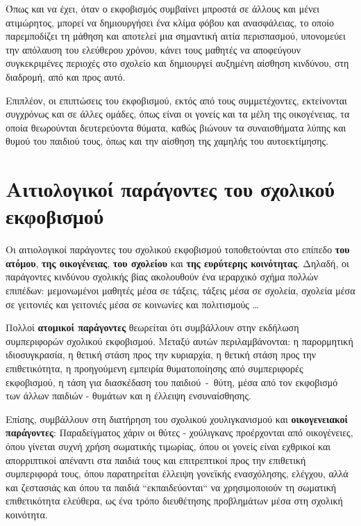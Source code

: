 \documentclass[12pt,a4paper,oneside]{book}
\begin{document}
\indent Όπως και να έχει, όταν ο εκφοβισμός συμβαίνει μπροστά σε άλλους και
μένει ατιμώρητος, μπορεί να δημιουργήσει ένα κλίμα φόβου και ανασφάλειας, το οποίο παρεμποδίζει τη μάθηση και αποτελεί μια
σημαντική αιτία περισπασμού, υπονομεύει την απόλαυση του ελεύθερου χρόνου, κάνει
τους μαθητές να αποφεύγουν συγκεκριμένες περιοχές στο σχολείο και δημιουργεί
αυξημένη αίσθηση κινδύνου, στη διαδρομή, από και προς αυτό.

\indent Επιπλέον, οι επιπτώσεις του εκφοβισμού, εκτός από τους συμμετέχοντες,
εκτείνονται συγχρόνως και σε άλλες ομάδες, όπως είναι οι γονείς και τα μέλη της οικογένειας, τα οποία θεωρούνται
δευτερεύοντα θύματα, καθώς βιώνουν τα συναισθήματα λύπης και θυμού του παιδιού
τους, όπως και την αίσθηση της χαμηλής του αυτοεκτίμησης.
\section*{Αιτιολογικοί παράγοντες του σχολικού εκφοβισμού}
\indent Οι αιτιολογικοί παράγοντες του σχολικού εκφοβισμού τοποθετούνται στο
επίπεδο \textbf{του ατόμου}, \textbf{της οικογένειας}, \textbf{του σχολείου} και \textbf{της ευρύτερης κοινότητας}.
Δηλαδή, οι παράγοντες κινδύνου σχολικής βίας ακολουθούν ένα ιεραρχικό σχήμα πολλών επιπέδων: μεμονωμένοι μαθητές μέσα σε
τάξεις, τάξεις μέσα σε σχολεία, σχολεία μέσα σε γειτονιές και  γειτονιές μέσα
σε κοινωνίες και πολιτισμούς \ldots

\indent Πολλοί \textbf{ατομικοί παράγοντες} θεωρείται ότι συμβάλλουν στην
εκδήλωση συμπεριφορών σχολικού εκφοβισμού. Μεταξύ αυτών περιλαμβάνονται: η παρορμητική ιδιοσυγκρασία, η θετική στάση προς την
κυριαρχία, η θετική στάση προς την επιθετικότητα, η προηγούμενη εμπειρία
θυματοποίησης από συμπεριφορές εκφοβισμού, η τάση για διασκέδαση του
\mbox{παιδιού - θύτη}, μέσα από τον εκφοβισμό των άλλων
παιδιών - θυμάτων και η έλλειψη \nohyphens{ενσυναίσθησης}.

\indent  Επίσης, συμβάλλουν στη διατήρηση του σχολικού χουλιγκανισμού και
\textbf{οικογενειακοί παράγοντες}: Παραδείγματος χάριν οι θύτες - χούλιγκανς
προέρχονται από οικογένειες, όπου γίνεται συχνή χρήση σωματικής τιμωρίας, όπου οι γονείς είναι εχθρικοί και απορριπτικοί απέναντι στα παιδιά
τους και επιτρεπτικοί προς την επιθετική συμπεριφορά τους, όπου παρατηρείται
έλλειψη γονεϊκής ενασχόλησης, ελέγχου, αλλά και ζεστασιάς και όπου τα παιδιά
``εκπαιδεύονται`` να χρησιμοποιούν τη σωματική επιθετικότητα ελεύθερα, ως ένα
τρόπο  διευθέτησης προβλημάτων μέσα στη σχολική κοινότητα.
\end{document}
